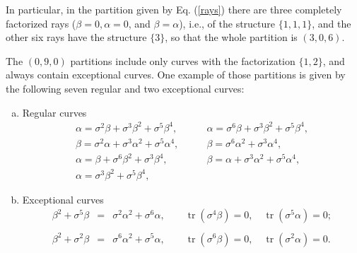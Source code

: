 \documentclass{article}
\DeclareMathOperator{\tr}{tr}
\begin{document}
In particular, in the partition given by Eq. (\ref{rays}) there are three
completely factorized rays ($\beta = 0, \alpha = 0$, and $\beta = \alpha$),
i.e., of the structure $\{1,1,1\}$, and the other six rays have the structure
$\{3\}$, so that the whole partition is $(3,0,6)$.

The $(0,9,0)$ partitions include only curves with the factorization $\{1,2\}$,
and always contain exceptional curves. One example of those partitions is given
by the following seven regular and two exceptional curves:

\begin{enumerate}[a)]
  \item Regular curves
    \begin{equation}
      \begin{array}{ll}
        \alpha = \sigma^{2}\beta + \sigma^{3}\beta^{2} + \sigma^{5}\beta^{4},
        \qquad
        & \alpha = \sigma^{6}\beta + \sigma^{3}\beta^{2} +
        \sigma^{5}\beta^{4},\\[4pt]
        \beta = \sigma^{2}\alpha + \sigma^{3}\alpha^{2} + \sigma^{5}\alpha^{4},
        \qquad
        & \beta = \sigma^{6}\alpha^{2} + \sigma^{3}\alpha^{4}, \\[4pt]
        \alpha = \beta + \sigma^{6}\beta^{2} + \sigma^{3}\beta^{4},
        \qquad
        & \beta = \alpha + \sigma^{3}\alpha^{2} + \sigma^{5}\alpha^{4}, \\[4pt]
        \alpha = \sigma^{3}\beta^{2} + \sigma^{5}\beta^{4},
        \qquad
        &
      \end{array}
    \end{equation}

  \item Exceptional curves
    \begin{eqnarray}
      \beta^{2} + \sigma^{5}\beta
      &=& \sigma^{2}\alpha^{2} + \sigma^{6}\alpha,
      \qquad 
      \tr(\sigma^{4}\beta)=0,
      \quad
      \tr(\sigma^{5}\alpha)=0;
      \nonumber \\
      && \\
      \beta^{2} + \sigma^{2}\beta
      &=& \sigma^{6}\alpha^{2} + \sigma^{5}\alpha,
      \qquad
      \tr(\sigma^{6}\beta)=0,
      \quad
      \tr(\sigma^{2}\alpha)=0.
      \nonumber
    \end{eqnarray}
\end{enumerate}
\end{document}
